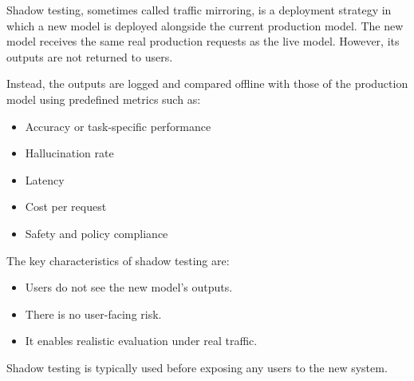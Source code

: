 \documentclass[a4paper]{article}
\title{}
\date{}
\begin{document}
    \maketitle
    Shadow testing, sometimes called traffic mirroring, is a deployment strategy in which a new model is deployed alongside the current production model. The new model receives the same real production requests as the live model. However, its outputs are not returned to users.
    
    Instead, the outputs are logged and compared offline with those of the production model using predefined metrics such as:
    
    \begin{itemize}
        \item Accuracy or task-specific performance
        \item Hallucination rate
        \item Latency
        \item Cost per request
        \item Safety and policy compliance
    \end{itemize}
    
    The key characteristics of shadow testing are:
    
    \begin{itemize}
        \item Users do not see the new model’s outputs.
        \item There is no user-facing risk.
        \item It enables realistic evaluation under real traffic.
    \end{itemize}
    
    Shadow testing is typically used before exposing any users to the new system.
\end{document}
